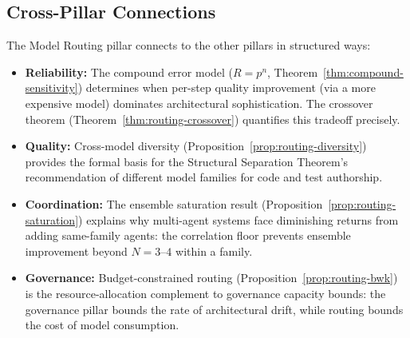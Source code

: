 \subsection{Cross-Pillar Connections}

The Model Routing pillar connects to the other pillars in structured ways:

\begin{itemize}[nosep]
\item \textbf{Reliability:} The compound error model ($R = p^n$, Theorem~\ref{thm:compound-sensitivity}) determines when per-step quality improvement (via a more expensive model) dominates architectural sophistication. The crossover theorem (Theorem~\ref{thm:routing-crossover}) quantifies this tradeoff precisely.
\item \textbf{Quality:} Cross-model diversity (Proposition~\ref{prop:routing-diversity}) provides the formal basis for the Structural Separation Theorem's recommendation of different model families for code and test authorship.
\item \textbf{Coordination:} The ensemble saturation result (Proposition~\ref{prop:routing-saturation}) explains why multi-agent systems face diminishing returns from adding same-family agents: the correlation floor prevents ensemble improvement beyond $N = 3$--$4$ within a family.
\item \textbf{Governance:} Budget-constrained routing (Proposition~\ref{prop:routing-bwk}) is the resource-allocation complement to governance capacity bounds: the governance pillar bounds the rate of architectural drift, while routing bounds the cost of model consumption.
\end{itemize}

